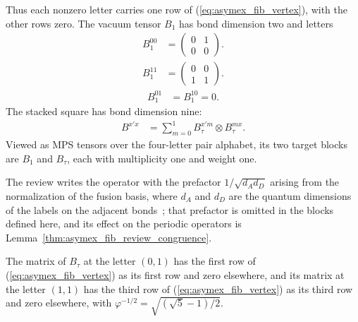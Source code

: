 \begin{definition}
    Thus each nonzero letter carries one row of
    (\ref{eq:asymex_fib_vertex}), with the other rows zero.
    The vacuum tensor $B_1$ has bond dimension two and letters
    \begin{align}
        B_1^{00} & =\begin{pmatrix}0&1\\0&0\end{pmatrix}.
        \label{eq:asymex_fib_one_00}
    \end{align}
    \begin{align}
        B_1^{11} & =\begin{pmatrix}0&0\\1&1\end{pmatrix}.
        \label{eq:asymex_fib_one_11}
    \end{align}
    \begin{align}
        B_1^{01} & =B_1^{10}=0.
        \label{eq:asymex_fib_one_off}
    \end{align}
    The stacked square has bond dimension nine:
    \begin{align}
        B^{x'x} & =\sum_{m=0}^1 B_\tau^{x'm}\otimes B_\tau^{mx}.
        \label{eq:asymex_fib_stack}
    \end{align}
    Viewed as MPS tensors over the four-letter pair alphabet, its two
    target blocks are $B_1$ and $B_\tau$, each with multiplicity one
    and weight one.
\end{definition}

The review writes the operator with the prefactor $1/\sqrt{d_Ad_D}$
arising from the normalization of the fusion basis, where $d_A$ and
$d_D$ are the quantum dimensions of the labels on the adjacent
bonds~\cite[Appendix~A, ``The MPO for the Fibonacci model'']{Cirac2021Matrix};
that prefactor is omitted in the blocks defined here, and its effect on the
periodic operators is Lemma~\ref{thm:asymex_fib_review_congruence}.

\begin{lemma}
    \label{thm:asymex_fib_entries}
    \leanok
    The matrix of $B_\tau$ at the letter $(0,1)$ has the first row of
    (\ref{eq:asymex_fib_vertex}) as its first row and zero elsewhere, and
    its matrix at the letter $(1,1)$ has the third row of
    (\ref{eq:asymex_fib_vertex}) as its third row and zero elsewhere, with
    $\varphi^{-1/2}=\sqrt{(\sqrt5-1)/2}$.
\end{lemma}


